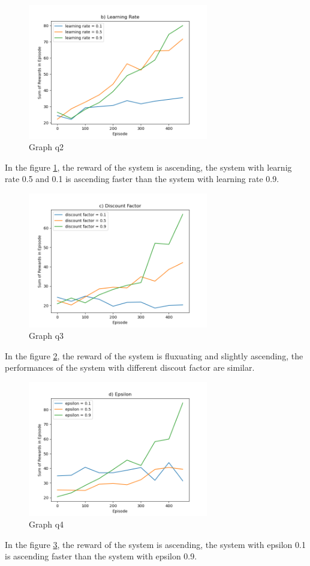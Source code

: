 \documentclass{article}
\begin{document}
\begin{figure}[h!]
    \centering
    \includegraphics[width=0.7\textwidth]{graph b.png}
    \caption{Graph q2}\label{fig:pb3graph2}
\end{figure}
In the figure \ref{fig:pb3graph2}, the reward of the system is ascending,
the system with learnig rate 0.5 and 0.1 is ascending faster than the system with
learning rate 0.9.

\begin{figure}[h!]
    \centering
    \includegraphics[width=0.7\textwidth]{graph c.png}
    \caption{Graph q3}\label{fig:pb3graph3}
\end{figure}
In the figure \ref{fig:pb3graph3}, the reward of the system is fluxuating and slightly ascending,
the performances of the system with different discout factor are similar.

\begin{figure}[h!]
    \centering
    \includegraphics[width=0.7\textwidth]{graph d.png}
    \caption{Graph q4}\label{fig:pb3graph4}
\end{figure}
In the figure \ref{fig:pb3graph4}, the reward of the system is ascending,
the system with epsilon 0.1 is ascending faster than the system with epsilon 0.9.
\end{document}
